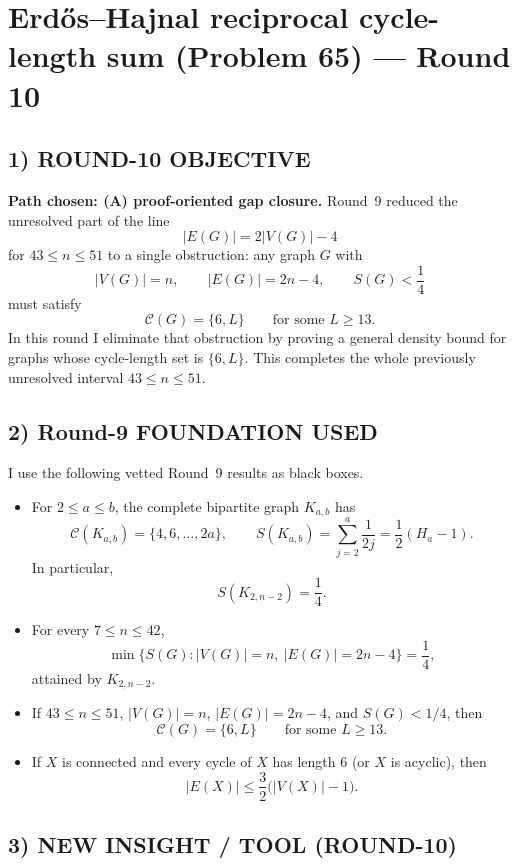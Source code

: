 \section{Erd\H{o}s--Hajnal reciprocal cycle-length sum (Problem 65) --- Round 10}

\subsection*{1) ROUND-10 OBJECTIVE}

\textbf{Path chosen: (A) proof-oriented gap closure.}
Round~9 reduced the unresolved part of the line
\[
|E(G)|=2|V(G)|-4
\]
for $43\le n\le 51$ to a single obstruction: any graph $G$ with
\[
|V(G)|=n,\qquad |E(G)|=2n-4,\qquad S(G)<\frac14
\]
must satisfy
\[
\mathcal C(G)=\{6,L\}
\qquad\text{for some }L\ge 13.
\]
In this round I eliminate that obstruction by proving a general density bound for graphs whose cycle-length set is $\{6,L\}$. This completes the whole previously unresolved interval $43\le n\le 51$.

\subsection*{2) Round-9 FOUNDATION USED}

I use the following vetted Round~9 results as black boxes.
\begin{itemize}
\item[(F1)] For $2\le a\le b$, the complete bipartite graph $K_{a,b}$ has
\[
\mathcal C(K_{a,b})=\{4,6,\dots,2a\},
\qquad
S(K_{a,b})=\sum_{j=2}^{a}\frac1{2j}=\frac12(H_a-1).
\]
In particular,
\[
S(K_{2,n-2})=\frac14.
\]

\item[(F2)] For every $7\le n\le 42$,
\[
\min\{S(G): |V(G)|=n,\ |E(G)|=2n-4\}=\frac14,
\]
attained by $K_{2,n-2}$.

\item[(F3)] If $43\le n\le 51$, $|V(G)|=n$, $|E(G)|=2n-4$, and $S(G)<1/4$, then
\[
\mathcal C(G)=\{6,L\}
\qquad\text{for some }L\ge 13.
\]

\item[(F4)] If $X$ is connected and every cycle of $X$ has length $6$ (or $X$ is acyclic), then
\[
|E(X)|\le \frac32\bigl(|V(X)|-1\bigr).
\]
\end{itemize}

\subsection*{3) NEW INSIGHT / TOOL (ROUND-10)}

